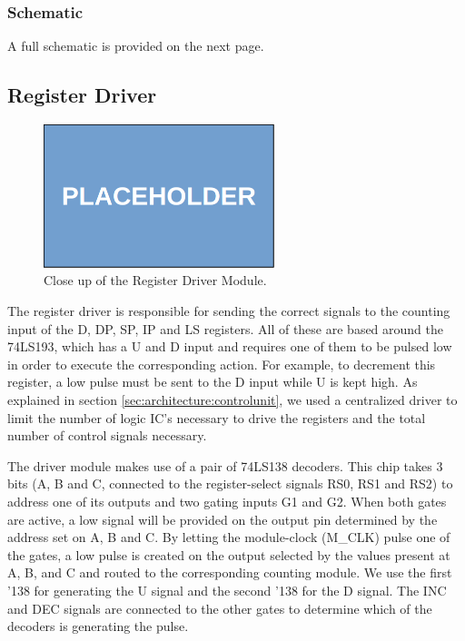 \subsubsection{Schematic}
A full schematic is provided on the next page.



\subsection{Register Driver} \label{sec:implementation:registerdriver}
\begin{figure}[H]
  \centering
  \includegraphics[width=0.6\textwidth]{img/placeholder}
  \caption{Close up of the Register Driver Module.}
  \label{fig:registerdrivercloseup}
\end{figure}
The register driver is responsible for sending the correct signals to the counting input of the D, DP, SP, IP and LS registers. All of these are based around the 74LS193, which has a U and D input and requires one of them to be pulsed low in order to execute the corresponding action. For example, to decrement this register, a low pulse must be sent to the D input while U is kept high. As explained in section \ref{sec:architecture:controlunit}, we used a centralized driver to limit the number of logic IC's necessary to drive the registers and the total number of control signals necessary.

The driver module makes use of a pair of 74LS138 decoders. This chip takes 3 bits (A, B and C, connected to the register-select signals RS0, RS1 and RS2) to address one of its outputs and two gating inputs G1 and G2. When both gates are active, a low signal will be provided on the output pin determined by the address set on A, B and C. By letting the module-clock (M\_CLK) pulse one of the gates, a low pulse is created on the output selected by the values present at A, B, and C and routed to the corresponding counting module. We use the first '138 for generating the U signal and the second '138 for the D signal. The INC and DEC signals are connected to the other gates to determine which of the decoders is generating the pulse.


